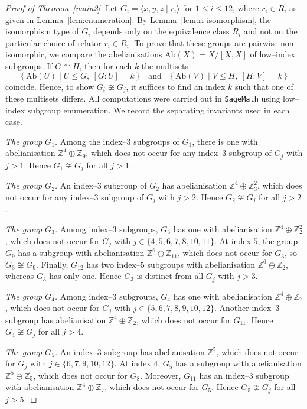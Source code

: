 \documentclass[a4paper,12pt,oneside]{article}
\begin{document}
\begin{proof}[Proof of Theorem~\ref{main2}]
Let $G_i=\langle x,y,z\mid r_i\rangle$ for $1\le i\le12$, where $r_i\in R_i$ as given in Lemma~\ref{lem:enumeration}. By Lemma~\ref{lem:ri-isomorphism}, the isomorphism type of $G_i$ depends only on the equivalence class $R_i$ and not on the particular choice of relator $r_i\in R_i$. To prove that these groups are pairwise non--isomorphic, we compare the abelianisations $\mathrm{Ab}(X)=X/[X,X]$ of low--index subgroups. If $G\cong H$, then for each $k$ the multisets
\[
\bigl\{\,\mathrm{Ab}(U)\mid U\le G,\ [G:U]=k\,\bigr\}
\quad\text{and}\quad
\bigl\{\,\mathrm{Ab}(V)\mid V\le H,\ [H:V]=k\,\bigr\}
\]
coincide.  Hence, to show $G_i\not\cong G_j$, it suffices to find an index $k$ such that one of these multisets differs. All computations were carried out in \texttt{SageMath} using low--index subgroup enumeration.  We record the separating invariants used in each case.

\medskip
\noindent\emph{The group $G_1$.}  
Among the index--$3$ subgroups of $G_1$, there is one with abelianisation $\mathbb Z^4\oplus\mathbb Z_9$, which does not occur for any index--$3$ subgroup of $G_j$ with $j>1$.  Hence $G_1\not\cong G_j$ for all $j>1$.

\medskip
\noindent\emph{The group $G_2$.}  
An index--$3$ subgroup of $G_2$ has abelianisation $\mathbb Z^4\oplus\mathbb Z_3^2$, which does not occur for any index--$3$ subgroup of $G_j$ with $j>2$.  Hence $G_2\not\cong G_j$ for all $j>2$.

\medskip
\noindent\emph{The group $G_3$.}  
Among index--$3$ subgroups, $G_3$ has one with abelianisation $\mathbb Z^4\oplus\mathbb Z_2^2$, which does not occur for $G_j$ with $j\in\{4,5,6,7,8,10,11\}$.  
At index $5$, the group $G_9$ has a subgroup with abelianisation $\mathbb Z^6\oplus\mathbb Z_{11}$, which does not occur for $G_3$, so $G_3\not\cong G_9$.  
Finally, $G_{12}$ has two index--$5$ subgroups with abelianisation $\mathbb Z^6\oplus\mathbb Z_2$, whereas $G_3$ has only one.  Hence $G_3$ is distinct from all $G_j$ with $j>3$.

\medskip
\noindent\emph{The group $G_4$.}  
Among index--$3$ subgroups, $G_4$ has one with abelianisation $\mathbb Z^4\oplus\mathbb Z_7$, which does not occur for $G_j$ with $j\in\{5,6,7,8,9,10,12\}$.  
Another index--$3$ subgroup has abelianisation $\mathbb Z^4\oplus\mathbb Z_2$, which does not occur for $G_{11}$.  Hence $G_4\not\cong G_j$ for all $j>4$.

\medskip
\noindent\emph{The group $G_5$.}  
An index--$3$ subgroup has abelianisation $\mathbb Z^5$, which does not occur for $G_j$ with $j\in\{6,7,9,10,12\}$.  
At index $4$, $G_5$ has a subgroup with abelianisation $\mathbb Z^5\oplus\mathbb Z_5$, which does not occur for $G_8$.  
Moreover, $G_{11}$ has an index--$3$ subgroup with abelianisation $\mathbb Z^4\oplus\mathbb Z_7$, which does not occur for $G_5$.  
Hence $G_5\not\cong G_j$ for all $j>5$.


\end{proof}
\end{document}
